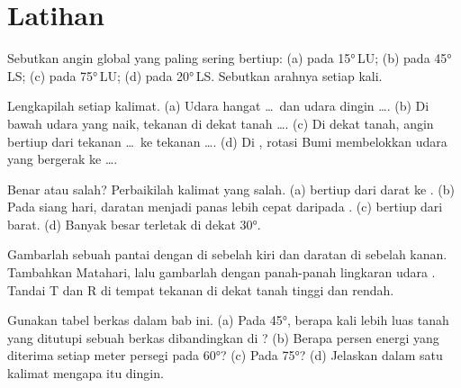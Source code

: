 \section{Latihan}

\begin{exercise}[$\star$]\label{exo:g8:winds-global-circulation:1}
Sebutkan angin global yang paling sering bertiup: (a) pada \ang{15}\,LU;
(b) pada \ang{45}\,LS; (c) pada \ang{75}\,LU; (d) pada \ang{20}\,LS.
Sebutkan arahnya setiap kali.
\end{exercise}

\begin{exercise}[$\star$]\label{exo:g8:winds-global-circulation:2}
Lengkapilah setiap kalimat. (a) Udara hangat \dots\ dan udara dingin
\dots. (b) Di bawah udara yang naik, tekanan di dekat tanah \dots. (c) Di
dekat tanah, angin bertiup dari tekanan \dots\ ke tekanan \dots. (d) Di
, rotasi Bumi membelokkan udara yang bergerak ke \dots.
\end{exercise}

\begin{exercise}[$\star$]\label{exo:g8:winds-global-circulation:3}
Benar atau salah? Perbaikilah kalimat yang salah. (a)  bertiup
dari darat ke . (b) Pada siang hari, daratan menjadi panas lebih cepat
daripada . (c)  bertiup dari barat. (d) Banyak  besar
terletak di dekat  \ang{30}.
\end{exercise}

\begin{exercise}[$\star$]\label{exo:g8:winds-global-circulation:4}
Gambarlah sebuah pantai dengan  di sebelah kiri dan daratan di sebelah
kanan. Tambahkan Matahari, lalu gambarlah dengan panah-panah lingkaran
udara . Tandai T dan R di tempat tekanan di dekat tanah tinggi
dan rendah.
\end{exercise}

\begin{exercise}[$\star\star$]\label{exo:g8:winds-global-circulation:5}
Gunakan tabel berkas dalam bab ini. (a) Pada \ang{45}, berapa kali lebih
luas tanah yang ditutupi sebuah berkas dibandingkan di ?
(b) Berapa persen energi  yang diterima setiap meter persegi
pada \ang{60}? (c) Pada \ang{75}? (d) Jelaskan dalam satu kalimat mengapa
 itu dingin.
\end{exercise}

